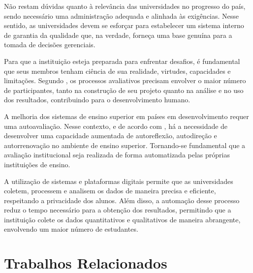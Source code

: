 

Não restam dúvidas quanto à relevância das universidades no progresso do país, sendo necessário uma administração adequada e alinhada às exigências. Nesse sentido, as universidades devem se esforçar para estabelecer um sistema interno de garantia da qualidade que, na verdade, forneça uma base genuína para a tomada de decisões gerenciais. 

Para que a instituição esteja preparada para enfrentar desafios, é fundamental que seus membros tenham ciência de sua realidade, virtudes, capacidades e limitações.
Segundo , os processos avaliativos precisam envolver o maior número de participantes, tanto na construção de seu projeto quanto na análise e no uso dos resultados, contribuindo para o desenvolvimento humano.

A melhoria dos sistemas de ensino superior em países em desenvolvimento requer uma autoavaliação. Nesse contexto, e de acordo com , há a necessidade de desenvolver uma capacidade aumentada de autoreflexão, autodireção e autorrenovação no ambiente de ensino superior. Tornando-se fundamental que a avaliação institucional seja realizada de forma automatizada pelas próprias instituições de ensino.

A utilização de sistemas e plataformas digitais permite que as universidades coletem, processem e analisem os dados de maneira precisa e eficiente, respeitando a privacidade dos alunos. Além disso, a automação desse processo reduz o tempo necessário para a obtenção dos resultados, permitindo que a instituição colete os dados quantitativos e qualitativos de maneira abrangente, envolvendo um maior número de estudantes.



\section{Trabalhos Relacionados}

